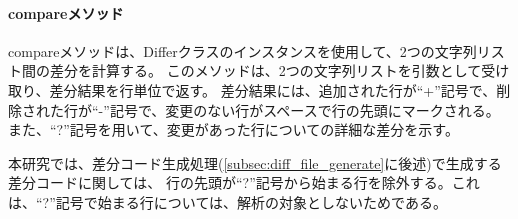 \paragraph{compareメソッド}
compareメソッドは、Differクラスのインスタンスを使用して、2つの文字列リスト間の差分を計算する。
このメソッドは、2つの文字列リストを引数として受け取り、差分結果を行単位で返す。
差分結果には、追加された行が“+”記号で、削除された行が“-”記号で、変更のない行がスペースで行の先頭にマークされる。
また、“?”記号を用いて、変更があった行についての詳細な差分を示す。
\par
本研究では、差分コード生成処理(\ref{subsec:diff_file_generate}に後述)で生成する差分コードに関しては、
行の先頭が“?”記号から始まる行を除外する。これは、“?”記号で始まる行については、解析の対象としないためである。


